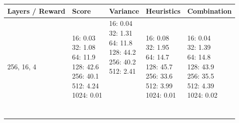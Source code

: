 \documentclass[11pt, fleqn]{article}
\begin{document}
\begin{table}[H]
	\centering
	\begin{tabular}{@{}l|llll@{}}
		\toprule
		Layers / Reward& Score & Variance & Heuristics & Combination\\ \midrule
		256, 16, 4     &   \shortstack[l]{16: 0.03\pro\\32: 1.08\pro\\64: 11.9\pro\\128: 42.6\pro\\256: 40.1\pro\\512: 4.24\pro\\1024: 0.01\pro}     &    \shortstack[l]{16: 0.04\pro\\32: 1.31\pro\\64: 11.8\pro\\128: 44.2\pro\\256: 40.2\pro\\512: 2.41\pro\\ \ \\ \ \\ \ \\ \ }       &            \shortstack[l]{16: 0.08\pro\\32: 1.95\pro\\64: 14.7\pro\\128: 45.7\pro\\256: 33.6\pro\\512: 3.99\pro\\1024: 0.01\pro} &                                             \shortstack[l]{16: 0.04\pro\\32: 1.39\pro\\64: 14.8\pro\\128: 43.9\pro\\256: 35.5\pro\\512: 4.39\pro\\1024: 0.02\pro}             \\\\

\end{tabular}
\end{table}
\end{document}
